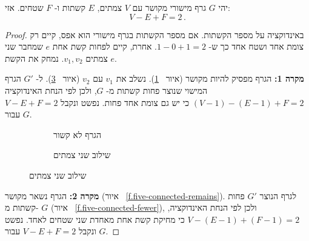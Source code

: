 \begin{theorem}[\L{Euler}]\label{thm.euler}
יהי
$G$
גרף מישורי מקושר עם
$V$
צמתים,
$E$
קשתות ו-%
$F$
שטחים. אזי:
\[
V-E+F=2\,.
\]
\end{theorem}
\begin{proof}
באינדוקציה על מספר הקשתות. אם מספר הקשתות בגרף מישורי הוא אפס, קיים רק צומת אחד ושטח אחד כך ש-%
$1-0+1=2$.
אחרת, קיים לפחות קשת אחת
$e$
שמחבר שני צמתים
$v_1,v_2$.
נמחק את הקשת
$e$.

\textbf{מקרה 1:}
הגרף מפסיק להיות מקושר
(איור~
\ref{f.five-disconnected-removing}).
נשלב את
$v_1$
עם
$v_2$
(איור~
\ref{f.five-disconnected-merge}).
ל-%
$G'$
הגרף המישוי שנוצר פחות קשתות מ-%
$G$,
ולכן לפי הנחת האינדוקציה
$(V-1)-(E-1)+F=2$
כי יש גם צומת אחד פחות. נפשט ונקבל
$V-E+F=2$
עבור
$G$.

\begin{figure}[tb]
\begin{center}
\begin{subfigure}{.4\textwidth}\centering
{}
\caption{הגרף לא קשור}\label{f.five-disconnected-removing}
\end{subfigure}
\hspace{3em}
\begin{subfigure}{.4\textwidth}\centering
{}
\caption{שילוב שני צמתים}\label{f.five-disconnected-merge}
\end{subfigure}
\end{center}
\end{figure}

\textbf{מקרה 2:}
הגרף נשאר מקושר
(איור~
\ref{f.five-connected-remains}).
לגרף הנוצר
$G'$
פחות קשתות מ-%
$G$
(איור~
\ref{f.five-connected-fewer}),
ולכן לפי הנחת האינדוקציה,
$V-(E-1)+(F-1)=2$
כי מחיקת קשת אחת מאחדת שני שטחים לאחד. נפשט ונקבל
$V-E+F=2$ 
עבור
$G$.
\end{proof}

